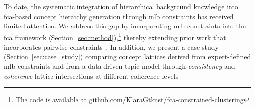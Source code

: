 
To date, the systematic integration of hierarchical background knowledge into \ac{fca}-based concept hierarchy generation through \ac{mlb} constraints has received limited attention.
We address this gap by incorporating \ac{mlb} constraints into the \ac{fca} framework (Section~\ref{sec:method}),\footnote{The code is available at \url{github.com/KlaraGtknst/fca-constrained-clustering}} thereby extending prior work that incorporates pairwise constraints~\cite{belohlavek2011selecting}.
In addition, we present a case study (Section~\ref{sec:case_study}) comparing concept lattices derived from expert-defined \ac{mlb} constraints and from a data-driven topic model through \textit{consistency} and \textit{coherence} lattice intersections at different coherence levels.


